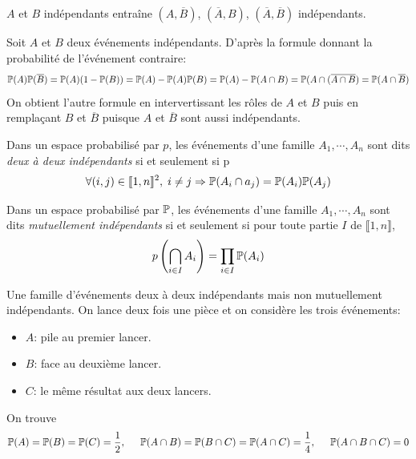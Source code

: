 \begin{prop}
  $A$ et $B$ indépendants entraîne $(A,\overline{B})$, $(\overline{A},B)$, $(\overline{A},\overline{B})$ indépendants.
\end{prop}
\begin{demo}
Soit $A$ et $B$ deux événements indépendants. D'après la formule donnant la probabilité de l'événement contraire:
\begin{displaymath}
  \mathbb{P}(A)\mathbb{P}(\overline{B})=\mathbb{P}(A)(1-\mathbb{P}(B)) = \mathbb{P}(A) - \mathbb{P}(A)\mathbb{P}(B) = \mathbb{P}(A) - \mathbb{P}(A\cap B) = \mathbb{P}(A \cap (\overline{A\cap B}) = \mathbb{P}(A \cap \overline{B})
\end{displaymath}
On obtient l'autre formule en intervertissant les rôles de $A$ et $B$ puis en remplaçant $B$ et $\overline{B}$ puisque $A$ et $\overline{B}$ sont aussi indépendants.
\end{demo}
\begin{defi}
Dans un espace probabilisé par $p$, les événements d'une famille $A_1,\cdots,A_n$ sont dits \emph{deux à deux indépendants} si et seulement si p 
\begin{displaymath}
  \forall (i,j)\in \llbracket 1,n \rrbracket^2,\; i\neq j \Rightarrow \mathbb{P}(A_i \cap a_j) = \mathbb{P}(A_i)\mathbb{P}(A_j)
\end{displaymath}  
\end{defi}

\begin{defi}
Dans un espace probabilisé par $\mathbb{P}$, les événements d'une famille $A_1,\cdots,A_n$ sont dits \emph{mutuellement indépendants} si et seulement si pour toute partie $I$ de $\llbracket 1,n \rrbracket$, 
\begin{displaymath}
  p\left( \bigcap_{i\in I}A_i\right)  = \prod_{i\in I}\mathbb{P}(A_i)
\end{displaymath}  
\end{defi}
\begin{exple}
  Une famille d'événements deux à deux indépendants mais non mutuellement indépendants.\newline
On lance deux fois une pièce et on considère les trois événements:
\begin{itemize}
  \item $A$: pile au premier lancer.
  \item $B$: face au deuxième lancer.
  \item $C$: le même résultat aux deux lancers.
\end{itemize}
On trouve 
\begin{displaymath}
  \mathbb{P}(A)= \mathbb{P}(B) = \mathbb{P}(C) = \frac{1}{2},\hspace{0.5cm} \mathbb{P}(A\cap B)= \mathbb{P}(B \cap C) = \mathbb{P}(A \cap C) = \frac{1}{4},\hspace{0.5cm} \mathbb{P}(A \cap B \cap C) = 0
\end{displaymath}
\end{exple}



